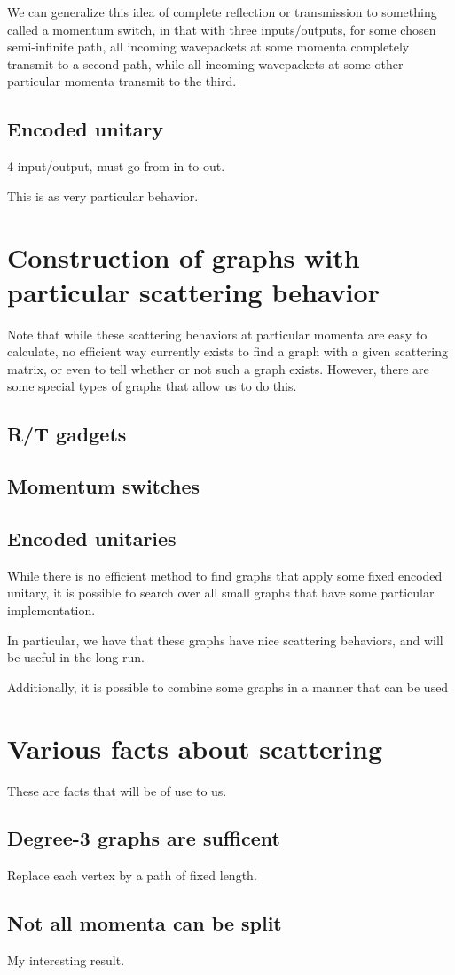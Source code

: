 \documentclass[../thesis-main/thesis-main]{subfiles}
\begin{document}
We can generalize this idea of complete reflection or transmission to something called a momentum switch, in that with three inputs/outputs, for some chosen semi-infinite path, all incoming wavepackets at some momenta completely transmit to a second path, while all incoming wavepackets at some other particular momenta transmit to the third.

\subsection{Encoded unitary}


4 input/output, must go from in to out.

This is as very particular behavior.


\section{Construction of graphs with particular scattering behavior}

Note that while these scattering behaviors at particular momenta are easy to calculate, no efficient way currently exists to find a graph with a given scattering matrix, or even to tell whether or not such a graph exists.  However, there are some special types of graphs that allow us to do this.

\subsection{R/T gadgets}

\subsection{Momentum switches}

\subsection{Encoded unitaries}

While there is no efficient method to find graphs that apply some fixed encoded unitary, it is possible to search over all small graphs that have some particular implementation.


In particular, we have that these graphs have nice scattering behaviors, and will be useful in the long run.

Additionally, it is possible to combine some graphs in a manner that can be used 


\section{Various facts about scattering}

These are facts that will be of use to us.

\subsection{Degree-3 graphs are sufficent}

Replace each vertex by a path of fixed length.

\subsection{Not all momenta can be split}

My interesting result.
\end{document}
